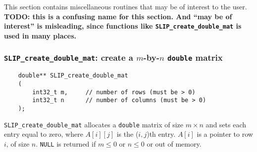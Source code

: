 \documentclass[12pt]{article}
\theoremstyle{definition}
\begin{document}
This section contains miscellaneous routines that may be of interest to the
user.
{\bf TODO: this is a confusing name for this section.  And ``may be of
interest'' is misleading, since functions like \verb|SLIP_create_double_mat| is
used in many places.}

\cprotect\subsubsection{\verb|SLIP_create_double_mat|: create a $m$-by-$n$ \verb|double| matrix} \label{ss:create_double_mat}

\begin{mdframed}[userdefinedwidth=6in]
{\footnotesize
\begin{verbatim}
    double** SLIP_create_double_mat
    (
        int32_t m,     // number of rows (must be > 0)
        int32_t n      // number of columns (must be > 0)
    );
\end{verbatim}
} \end{mdframed}

\verb|SLIP_create_double_mat| allocates a \verb|double| matrix of size $m
\times n$ and sets each entry equal to zero, where $A[i][j]$ is the ($i,j$)th
entry. $A[i]$ is a pointer to row $i$, of size $n$. \verb|NULL| is returned if
$m \le 0 $ or $n\le 0$ or out of memory.



\end{document}
